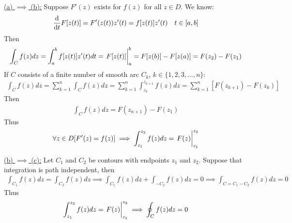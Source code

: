 \documentclass[12pt, english]{book}
\makeatletter
\renewenvironment{proof}[1][\proofname]{\par
	\pushQED{\qed}%
	\normalfont \topsep6\p@\@plus6\p@\relax
	\list{}{%
		\settowidth{\leftmargin}{\itshape\proofname:\hskip\labelsep}%
		\setlength{\labelwidth}{0pt}%
		\setlength{\itemindent}{-\leftmargin}%
	}%
	\item[\hskip\labelsep\itshape#1\@addpunct{:}]\ignorespaces
	}{ \popQED\endlist\@endpefalse}
\makeatother
\begin{document}
	\begin{proof}
		\underline{(a) \(\implies\) (b):} \newline
		Suppose \(F'(z)\) exists for \(f(z)\) for all \(z \in D\). We know:
		\begin{align*}
			\dv{t} F[z(t)] &= F'(z(t)) z'(t) = f[z(t)]z'(t) & t \in [a,b]
		\end{align*}
		Then 
		\begin{align*}
			\int_{C} f(z) dz = \int_{a}^{b} f[z(t)] z'(t) dt = \eval{F[z(t)]}_{a}^{b} = F[z(b)] - F[z(a)] = F(z_2) - F(z_1) 
		\end{align*}
		If \(C\) consists of a finite number of smooth arc \(C_k\), \(k \in \{1, 2, 3, \ldots, n\}\):
		\begin{align*}
			\int_{C} f(z) dz = \sum_{k=1}^{n} \int_{C} f(z) dz = \sum_{k=1}^{n} \int_{z_k}^{z_{k+1}} f(z) dz = \sum_{k=1}^{n}[F(z_{k+1}) - F(z_k)]
 		\end{align*}
		Then 
		\begin{align*}
			\int_{C} f(z) dz = F(z_{n+1}) - F(z_1)
		\end{align*}
		Thus 
		\begin{align*}
			\forall z \in D [F'(z) = f(z)] 
			\implies \int_{z_1}^{z_2} f(z) dz = \eval{F(z)}_{z_1}^{z_2}
		\end{align*}
		
		\underline{(b) \(\implies\) (c):} \newline
		Let \(C_1\) and \(C_2\) be contours with endpoints \(z_1\) and \(z_2\). Suppose that integration is path independent, then
		\begin{align*}
			\int_{C_1} f(z) dz = \int_{C_2} f(z) dz
			\implies \int_{C_1} f(z) dz + \int_{-C_2} f(z) dz = 0 
			\implies \int_{C = C_1 - C_2} f(z) dz = 0
		\end{align*}
		Thus 
		\begin{align*}
			\int_{z_1}^{z_2} f(z) dz = \eval{F(z)}_{z_1}^{z_2}
			\implies \oint_{C} f(z) dz = 0
		\end{align*}
		

\end{proof}
\end{document}
